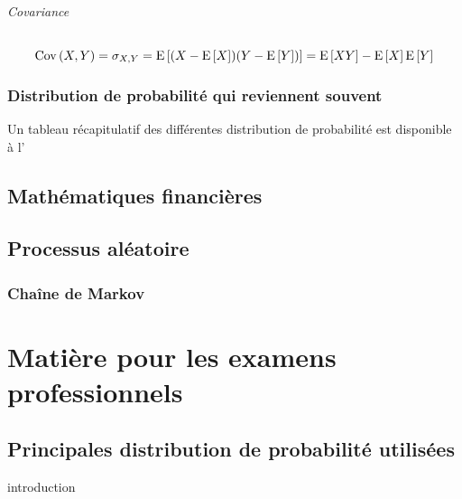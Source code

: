\documentclass[12pt, french]{report}
\begin{document}
\paragraph{Covariance}
\begin{equation}
\label{eq:covariance}
\mathrm{Cov} \left( X,Y \right) =  \sigma_{X,Y} = \mathrm{E} \left[ (X-\mathrm{E} \left[ X \right])(Y - \mathrm{E} \left[ Y \right]) \right] = \mathrm{E} \left[ XY \right] - \mathrm{E} \left[ X \right] \mathrm{E} \left[ Y \right]
\end{equation}



\section{Distribution de probabilité qui reviennent souvent}
Un tableau récapitulatif des différentes distribution de probabilité est disponible à l'


\chapter{Mathématiques financières}


\chapter{Processus aléatoire}

\section{Chaîne de Markov}
\label{sec:chaine-markov}



\part{Matière pour les examens professionnels}



\appendix
\chapter{Principales distribution de probabilité utilisées}
introduction
\end{document}
